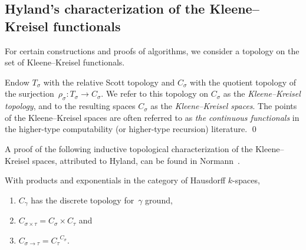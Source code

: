 \documentclass{LMCS}
\newcommand{\total}[1]{{\T_{#1}}}
\newcommand{\C}{C}
\newcommand{\T}{T}
\newcommand{\kk}[1]{{\C_{#1}}}
\newcommand{\tproduct}{\sigma \times \tau}
\newcommand{\tfunction}{\sigma \to \tau}
\newcommand{\rh}[1]{\rho_{#1}}
\begin{document}
\subsection{Hyland's characterization of the Kleene--Kreisel
  functionals} \label{hyland} For certain constructions and proofs of
algorithms, we consider a topology on the set of Kleene--Kreisel
functionals.
\begin{defi}
  Endow $\total{\sigma}$ with the relative Scott topology and
  $\kk{\sigma}$ with the quotient topology of the
  surjection~$\rh{\sigma} \colon \total{\sigma} \to \kk{\sigma}$.  We
  refer to this topology on $\kk{\sigma}$ as the \emph{Kleene--Kreisel
    topology}, and to the resulting spaces $\kk{\sigma}$ as the
  \emph{Kleene--Kreisel spaces}. The points of the Kleene--Kreisel
  spaces are often referred to as \emph{the continuous functionals} in
  the higher-type computability (or higher-type recursion) literature.
  \qed
\end{defi}
A proof of the following inductive topological characterization of the
Kleene--Kreisel spaces, attributed to Hyland, can be found in
Normann~\cite{normann:recursion}.
\begin{lem} 
  With products and exponentials in the category of
  Hausdorff $k$-spaces,
\begin{enumerate}
\item $\kk{\gamma}$ has the discrete
topology for~$\gamma$ ground, 
\item  $\kk{\tproduct} = \kk{\sigma} \times \kk{\tau}$ and 
\item $\kk{\tfunction}
  = {\kk{\tau}}^{\kk{\sigma}}$.
\end{enumerate}

\end{lem}
\end{document}
